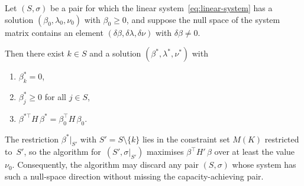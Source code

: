 
\begin{lemma}%
\label{lem:rank-deficiency-dismissal}
Let $(S, \sigma)$ be a pair for which the linear
system~\eqref{eq:linear-system} has a solution
$(\beta_0, \lambda_0, \nu_0)$ with $\beta_0 \geq 0$,
and suppose the null space of the system matrix contains an element
$(\delta\beta, \delta\lambda, \delta\nu)$ with
$\delta\beta \neq 0$.

Then there exist $k \in S$ and a solution
$(\beta^*, \lambda^*, \nu^*)$ with
\begin{enumerate}
\item $\beta^*_k = 0$,
\item $\beta^*_j \geq 0$ for all $j \in S$,
\item $\beta^{*\top} H\, \beta^* = \beta_0^\top H\, \beta_0$.
\end{enumerate}
The restriction $\beta^*|_{S'}$ with $S' = S \setminus \{k\}$
lies in the constraint set $M(K)$ restricted to~$S'$,
so the algorithm for~$(S', \sigma|_{S'})$ maximises
$\beta^\top H'\, \beta$ over at least the value~$\nu_0$.
Consequently, the algorithm may discard any pair $(S, \sigma)$
whose system has such a null-space direction
without missing the capacity-achieving pair.
\end{lemma}

